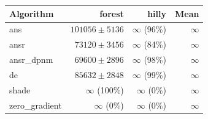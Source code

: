 \begin{tabular}{lrrr}
\toprule
Algorithm & forest & hilly & Mean \\
\midrule
ans & $101056 \pm 5136$ & $\infty$ (96\%) & $\infty$ \\
ansr & $73120 \pm 3456$ & $\infty$ (84\%) & $\infty$ \\
ansr\_dpnm & $69600 \pm 2896$ & $\infty$ (98\%) & $\infty$ \\
de & $85632 \pm 2848$ & $\infty$ (99\%) & $\infty$ \\
shade & $\infty$ (100\%) & $\infty$ (0\%) & $\infty$ \\
zero\_gradient & $\infty$ (0\%) & $\infty$ (0\%) & $\infty$ \\
\bottomrule
\end{tabular}
